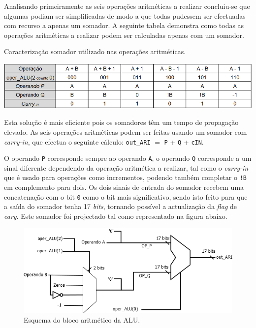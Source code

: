 \documentclass[11pt]{article}
\numberwithin{equation}{section}
\begin{document}
Analisando primeiramente as seis operações aritméticas a realizar concluiu-se que algumas podiam ser simplificadas de modo a que todas pudessem ser efectuadas com recurso a apenas um somador. A seguinte tabela demonstra como todas as operações aritméticas a realizar podem ser calculadas apenas com um somador.

\begin{table}[h]
	\centering
	\caption{Caracterização somador utilizado nas operações aritméticas.}
	\vspace{-2mm}
 	\includegraphics[keepaspectratio=true, scale=0.35]{tabelas/adder}
\end{table}

Esta solução é mais eficiente pois os somadores têm um tempo de propagação elevado. As seis operações aritméticas podem ser feitas usando um somador com \textit{carry-in}, que efectua o seguinte cálculo: \texttt{out\_ARI} $=$ \texttt{P} + \texttt{Q} + \texttt{cIN}. 

O operando \texttt{P} corresponde sempre ao operando \texttt{A}, o operando \texttt{Q} corresponde a  um sinal diferente dependendo da operação aritmética a realizar, tal como o \textit{carry-in} que é usado para operações como incrementos, podendo também completar o \texttt{!B} em complemento para dois. Os dois sinais de entrada do somador recebem uma concatenação com o bit \texttt{0} como o bit mais significativo, sendo isto feito para que a saída do somador tenha 17 \textit{bits}, tornando possível a actualização da \textit{flag} de \textit{cary}. Este somador foi projectado tal como representado na figura abaixo.

\vspace{1mm}

\begin{figure}[H]
	\centering
	\includegraphics[keepaspectratio=true, scale=0.40]{imagens/Arit}
	\caption{Esquema do bloco aritmético da ALU.}
	\vspace{-0.8em}
\end{figure}
\end{document}
